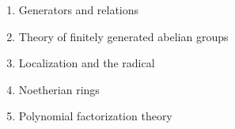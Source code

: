 \begin{enumerate}
  \item{
    Generators and relations
  }
  \item{
    Theory of finitely generated abelian groups
  }
  \item{
    Localization and the radical
  }
  \item{
    Noetherian rings
  }
  \item{
    Polynomial factorization theory
  }
\end{enumerate}
